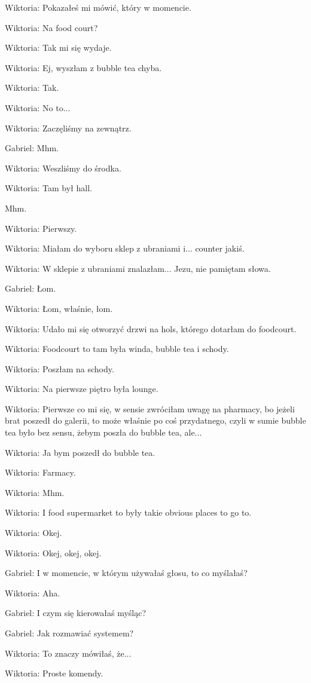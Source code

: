 Wiktoria: Pokazałeś mi mówić, który w momencie.

Wiktoria: Na food court?

Wiktoria: Tak mi się wydaje.

Wiktoria: Ej, wyszłam z bubble tea chyba.

Wiktoria: Tak.

Wiktoria: No to...

Wiktoria: Zaczęliśmy na zewnątrz.

Gabriel: Mhm.

Wiktoria: Weszliśmy do środka.

Wiktoria: Tam był hall.

Mhm.

Wiktoria: Pierwszy.

Wiktoria: Miałam do wyboru sklep z ubraniami i... counter jakiś.

Wiktoria: W sklepie z ubraniami znalazłam... Jezu, nie pamiętam słowa.

Gabriel: Łom.

Wiktoria: Łom, właśnie, łom.

Wiktoria: Udało mi się otworzyć drzwi na hols, którego dotarłam do foodcourt.

Wiktoria: Foodcourt to tam była winda, bubble tea i schody.

Wiktoria: Poszłam na schody.

Wiktoria: Na pierwsze piętro była lounge.

Wiktoria: Pierwsze co mi się, w sensie zwróciłam uwagę na pharmacy, bo jeżeli brat poszedł do galerii, to może właśnie po coś przydatnego, czyli w sumie bubble tea było bez sensu, żebym poszła do bubble tea, ale...

Wiktoria: Ja bym poszedł do bubble tea.

Wiktoria: Farmacy.

Wiktoria: Mhm.

Wiktoria: I food supermarket to były takie obvious places to go to.

Wiktoria: Okej.

Wiktoria: Okej, okej, okej.

Gabriel: I w momencie, w którym używałaś głosu, to co myślałaś?

Wiktoria: Aha.

Gabriel: I czym się kierowałaś myśląc?

Gabriel: Jak rozmawiać systemem?

Wiktoria: To znaczy mówiłaś, że...

Wiktoria: Proste komendy.

